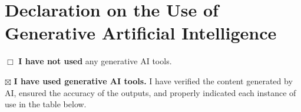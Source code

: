 \clearpage
\section{Declaration on the Use of Generative Artificial Intelligence}

\noindent $\Box$ \textbf{I have not used} any generative AI tools.

\noindent $\boxtimes$ \textbf{I have used generative AI tools.} I have verified the content generated by AI, ensured the accuracy of the outputs, and properly indicated each instance of use in the table below.


